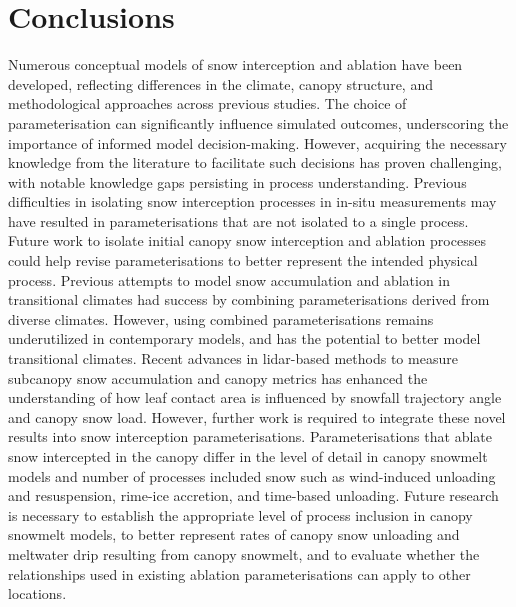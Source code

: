 \documentclass[
  letterpaper,
]{tex/uofsthesis-cs}
\begin{document}
\section{Conclusions}\label{conclusions}

Numerous conceptual models of snow interception and ablation have been
developed, reflecting differences in the climate, canopy structure, and
methodological approaches across previous studies. The choice of
parameterisation can significantly influence simulated outcomes,
underscoring the importance of informed model decision-making. However,
acquiring the necessary knowledge from the literature to facilitate such
decisions has proven challenging, with notable knowledge gaps persisting
in process understanding. Previous difficulties in isolating snow
interception processes in in-situ measurements may have resulted in
parameterisations that are not isolated to a single process. Future work
to isolate initial canopy snow interception and ablation processes could
help revise parameterisations to better represent the intended physical
process. Previous attempts to model snow accumulation and ablation in
transitional climates had success by combining parameterisations derived
from diverse climates. However, using combined parameterisations remains
underutilized in contemporary models, and has the potential to better
model transitional climates. Recent advances in lidar-based methods to
measure subcanopy snow accumulation and canopy metrics has enhanced the
understanding of how leaf contact area is influenced by snowfall
trajectory angle and canopy snow load. However, further work is required
to integrate these novel results into snow interception
parameterisations. Parameterisations that ablate snow intercepted in the
canopy differ in the level of detail in canopy snowmelt models and
number of processes included snow such as wind-induced unloading and
resuspension, rime-ice accretion, and time-based unloading. Future
research is necessary to establish the appropriate level of process
inclusion in canopy snowmelt models, to better represent rates of canopy
snow unloading and meltwater drip resulting from canopy snowmelt, and to
evaluate whether the relationships used in existing ablation
parameterisations can apply to other locations.
\end{document}
